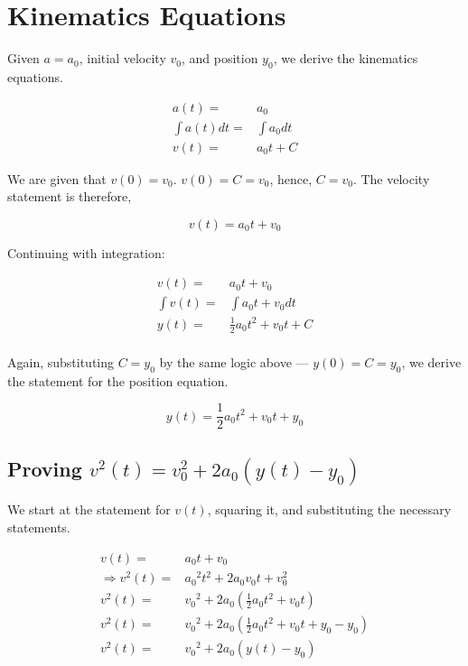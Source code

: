 \documentclass[letterpaper]{article}
\begin{document}
\section{Kinematics Equations}
\label{sec:org1e44f1a}
Given \(a=a_0\), initial velocity \(v_0\), and position \(y_0\), we derive the kinematics equations.

\begin{align}
    a(t) =& a_0 \\
    \int a(t) dt =& \int a_0 dt \\
    v(t) =& a_0t + C 
\end{align}

We are given that \(v(0)=v_0\). \(v(0) = C = v_0\), hence, \(C=v_0\). The velocity statement is therefore,

\begin{equation}
    v(t) = a_0t+v_0
\end{equation}

Continuing with integration:

\begin{align}
    v(t) =& a_0t + v_0 \\
    \int v(t) =& \int a_0t + v_0 dt \\
    y(t) =& \frac{1}{2}a_0t^2+v_0t+C \\
\end{align}

Again, substituting \(C = y_0\) by the same logic above --- \(y(0) = C = y_0\), we derive the statement for the position equation.

\begin{equation}
    y(t) = \frac{1}{2}a_0t^2 + v_0t + y_0
\end{equation}


\subsection{Proving \(v^2(t) = v_0^2 + 2a_0(y(t)-y_0)\)}
\label{sec:orgc95471b}
We start at the statement for \(v(t)\), squaring it, and substituting the necessary statements.

\begin{align}
    v(t) =& a_0t+v_0 \\
    \Rightarrow v^2(t) =& {a_0}^2 t^2 + 2a_0v_0t + v_0^2 \\
    v^2(t) =& {v_0}^2 + 2a_0 (\frac{1}{2} a_0 t^2 + v_0t) \\
    v^2(t) =& {v_0}^2 + 2a_0 (\frac{1}{2} a_0 t^2 + v_0t + y_0 - y_0) \\
    v^2(t) =& {v_0}^2 + 2a_0 (y(t) - y_0) 
\end{align}
\end{document}
